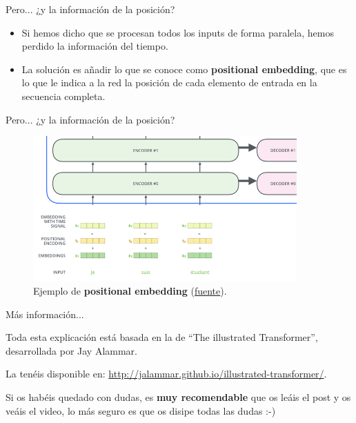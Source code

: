 \begin{frame}{Pero... ¿y la información de la posición?}

\begin{itemize}
    \item Si hemos dicho que se procesan todos los inputs de forma paralela, hemos perdido la información del tiempo.
    \item La solución es añadir lo que se conoce como \textbf{positional embedding}, que es lo que le indica a la red la posición de cada elemento de entrada en la secuencia completa.
\end{itemize}
\end{frame}

\begin{frame}{Pero... ¿y la información de la posición?}
\begin{figure}
    \centering
    \includegraphics[width=0.9\textwidth]{Slides/figures/02_Metodos_Generativos/trans-encoding.png}
    \caption{Ejemplo de \textbf{positional embedding} (\href{http://jalammar.github.io/illustrated-transformer/}{fuente}).}
\end{figure}
\end{frame}

\begin{frame}{Más información...}

Toda esta explicación está basada en la de ``The illustrated Transformer'', desarrollada por Jay Alammar.

La tenéis disponible en: \href{http://jalammar.github.io/illustrated-transformer/}{http://jalammar.github.io/illustrated-transformer/}.

Si os habéis quedado con dudas, es \textbf{muy recomendable} que os leáis el post y os veáis el video, lo más seguro es que os disipe todas las dudas :-)
\end{frame}




